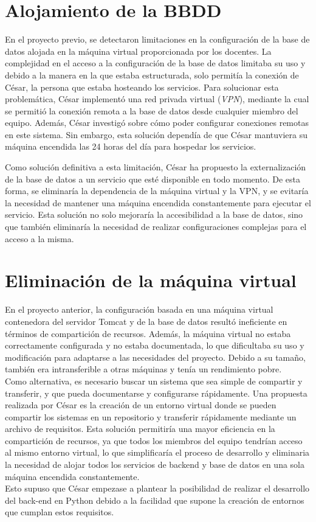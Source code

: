 \documentclass[12pt]{report}
\begin{document}
\section{Alojamiento de la BBDD}
En el proyecto previo, se detectaron limitaciones en la configuración de la base de datos alojada en la máquina virtual proporcionada por los docentes. La complejidad en el acceso a la configuración de la base de datos limitaba su uso y  debido a la manera en la que estaba estructurada, solo permitía la conexión de César, la persona que estaba hosteando los servicios. Para solucionar esta problemática, César implementó una red privada virtual (\textit{VPN}), mediante la cual se permitió la conexión remota a la base de datos desde cualquier miembro del equipo. Además, César investigó sobre cómo poder configurar conexiones remotas en este sistema. Sin embargo, esta solución dependía de que César mantuviera su máquina encendida las 24 horas del día para hospedar los servicios.

Como solución definitiva a esta limitación, César ha propuesto la externalización de la base de datos a un servicio que esté disponible en todo momento. De esta forma, se eliminaría la dependencia de la máquina virtual y la VPN, y se evitaría la necesidad de mantener una máquina encendida constantemente para ejecutar el servicio. Esta solución no solo mejoraría la accesibilidad a la base de datos, sino que también eliminaría la necesidad de realizar configuraciones complejas para el acceso a la misma.
\section{Eliminación de la máquina virtual} %
En el proyecto anterior, la configuración basada en una máquina virtual contenedora del servidor Tomcat y de la base de datos resultó ineficiente en términos de compartición de recursos. Además, la máquina virtual no estaba correctamente configurada y no estaba documentada, lo que dificultaba su uso y modificación para adaptarse a las necesidades del proyecto. Debido a su tamaño, también era intransferible a otras máquinas y tenía un rendimiento pobre.\\
Como alternativa, es necesario buscar un sistema que sea simple de compartir y transferir, y que pueda documentarse y configurarse rápidamente. Una propuesta realizada por César es la creación de un entorno virtual donde se pueden compartir los sistemas en un repositorio y transferir rápidamente mediante un archivo de requisitos. Esta solución permitiría una mayor eficiencia en la compartición de recursos, ya que todos los miembros del equipo tendrían acceso al mismo entorno virtual, lo que simplificaría el proceso de desarrollo y eliminaria la necesidad de alojar todos los servicios de backend y base de datos en una sola máquina encendida constantemente.\\
Esto supuso que César empezase a plantear la posibilidad de realizar el desarrollo del back-end en Python debido a la facilidad que supone la creación de entornos que cumplan estos requisitos.
\end{document}

